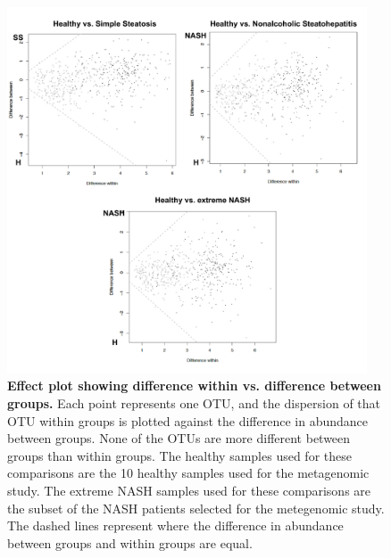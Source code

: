 \begin{figure}[h]
\begin{center}
\includegraphics[width=0.95\textwidth]{nafld_16s_aldex.png}
\caption[Effect plot showing difference within vs. difference between groups.]{\textbf{Effect plot showing difference within vs. difference between groups.} Each point represents one OTU, and the dispersion of that OTU within groups is plotted against the difference in abundance between groups. None of the OTUs are more different between groups than within groups. The healthy samples used for these comparisons are the 10 healthy samples used for the metagenomic study. The extreme NASH samples used for these comparisons are the subset of the NASH patients selected for the metegenomic study. The dashed lines represent where the difference in abundance between groups and within groups are equal.}
\label{nafld_fig3}
\end{center}
\end{figure}

